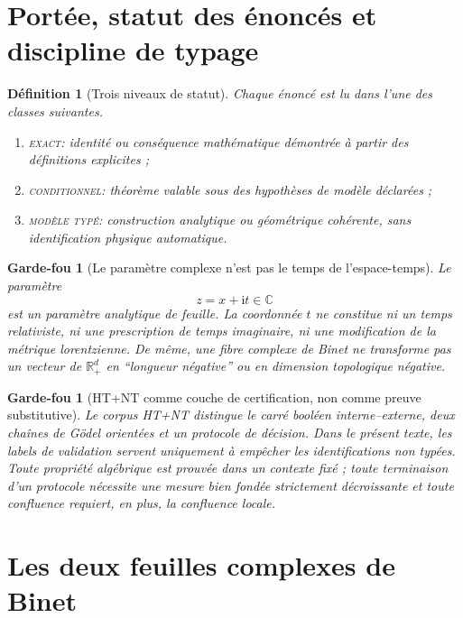\documentclass[11pt,a4paper]{article}
\newtheorem{definition}[theorem]{Définition}
\newtheorem{guardrail}[theorem]{Garde-fou}
\newcommand{\C}{\mathbb C}
\newcommand{\Rp}{\mathbb R_{+}}
\newcommand{\ii}{\mathrm i}
\newcommand{\statusExact}{\textsc{exact}}
\newcommand{\statusCond}{\textsc{conditionnel}}
\newcommand{\statusTyped}{\textsc{modèle typé}}
\begin{document}
\tableofcontents

\section{Portée, statut des énoncés et discipline de typage}

\begin{definition}[Trois niveaux de statut]
Chaque énoncé est lu dans l'une des classes suivantes.
\begin{enumerate}[label=\textup{(\roman*)}]
\item \statusExact : identité ou conséquence mathématique démontrée à partir des définitions explicites ;
\item \statusCond : théorème valable sous des hypothèses de modèle déclarées ;
\item \statusTyped : construction analytique ou géométrique cohérente, sans identification physique automatique.
\end{enumerate}
\end{definition}

\begin{guardrail}[Le paramètre complexe n'est pas le temps de l'espace-temps]
Le paramètre
\[
 z=x+\ii t\in\C
\]
est un paramètre analytique de feuille. La coordonnée $t$ ne constitue ni un temps relativiste, ni une prescription de temps imaginaire, ni une modification de la métrique lorentzienne. De même, une fibre complexe de Binet ne transforme pas un vecteur de $\Rp^d$ en ``longueur négative'' ou en dimension topologique négative.
\end{guardrail}

\begin{guardrail}[HT+NT comme couche de certification, non comme preuve substitutive]
Le corpus HT+NT distingue le carré booléen interne--externe, deux chaînes de Gödel orientées et un protocole de décision. Dans le présent texte, les labels de validation servent uniquement à empêcher les identifications non typées. Toute propriété algébrique est prouvée dans un contexte fixé ; toute terminaison d'un protocole nécessite une mesure bien fondée strictement décroissante et toute confluence requiert, en plus, la confluence locale.
\end{guardrail}

\section{Les deux feuilles complexes de Binet}
\end{document}
